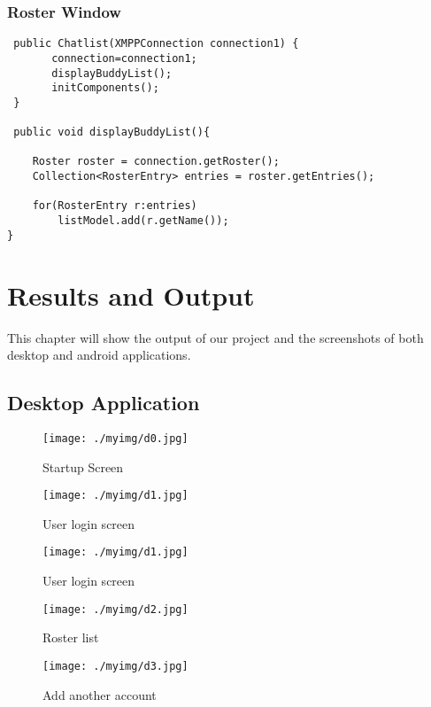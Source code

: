 \documentclass{SureshLimkar}
\begin{document}
\subsection{Roster Window}
\begin{lstlisting}
 public Chatlist(XMPPConnection connection1) {
       connection=connection1;
       displayBuddyList();
       initComponents();
 }
 
 public void displayBuddyList(){
	
	Roster roster = connection.getRoster();
	Collection<RosterEntry> entries = roster.getEntries();

	for(RosterEntry r:entries)
	    listModel.add(r.getName());
}
\end{lstlisting}

	
\chapter{Results and Output}

This chapter will show the output of our project and the screenshots of both desktop and android applications. 

\section{Desktop Application}

\begin{figure}[h]%
\centering
\texttt{[image: ./myimg/d0.jpg]}
\caption{Startup Screen}%
\label{Startup Screen}%
\end{figure}

\begin{figure}[h]
\centering
\texttt{[image: ./myimg/d1.jpg]}
\caption{User login screen}%
\label{User login screen}%
\end{figure}

\begin{figure}[h]%
\centering
\texttt{[image: ./myimg/d1.jpg]}
\caption{User login screen}%
\label{User login screen}%
\end{figure}

\begin{figure}[h]%
\centering
\texttt{[image: ./myimg/d2.jpg]}
\caption{Roster list}%
\label{Roster list}%
\end{figure}

\begin{figure}[h]%
\centering
\texttt{[image: ./myimg/d3.jpg]}
\caption{Add another account}%
\label{Add another account}%
\end{figure}
\end{document}
